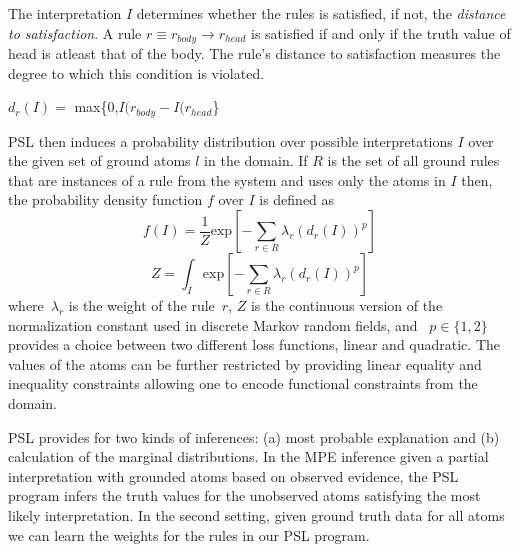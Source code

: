 The interpretation $\mathit{I}$ determines whether the rules is satisfied, if not, the \emph{distance to satisfaction}.
A rule $\mathit{r} \equiv \mathit{r_{body}} \rightarrow \mathit{r_{head}} $  is satisfied if and only if the truth value of head is atleast that of the body. The rule's distance to satisfaction measures the degree to which this condition is violated.
 \newline
\begin{center} 
 $\mathit{d_r}(\mathit{I}) =$ max\{0,$\mathit{I(r_{body}} - \mathit{I(r_{head}}$\}
 \end{center}

PSL then induces a probability distribution over possible interpretations $\mathit{I}$ over the given set of ground atoms $\mathit{l} $ in the domain. 
If $\mathit{R}$ is the set of all ground rules that are instances of a rule from the system and uses only the atoms in  $\mathit{I}$ then,
the probability density function $\mathit{f}$ over $\mathit{I}$ is defined as
\begin{equation}
\label{eq:contimn1}
    f (I) = \frac{1}{Z} \text{exp}[-\sum_{r\in R} \lambda_r (d_r(I))^p]
\end{equation}
\begin{equation}
\label{eq:contimn2}
	Z = \int_{I} \text{exp} [ -\sum_{r\in R} \lambda_r (d_r(I))^p ]
\end{equation}
where~$\lambda_r$ is the weight of the rule~$r$, $Z$ is the continuous version of the normalization constant used in discrete Markov random fields, and ~$p \in \{1, 2\}$ provides a choice between two different loss functions, linear and quadratic.
The values of the atoms can be further restricted by providing linear equality and inequality constraints allowing one to encode functional constraints from the domain. 

PSL provides for two kinds of inferences:
(a) most probable explanation and (b) calculation of the marginal distributions. 
In the MPE inference given a partial interpretation with grounded atoms based on observed evidence, the PSL program infers the truth values for the unobserved atoms satisfying the most likely interpretation. 
In the second setting, given ground truth data for all atoms we can learn the weights for the rules in our PSL program.
